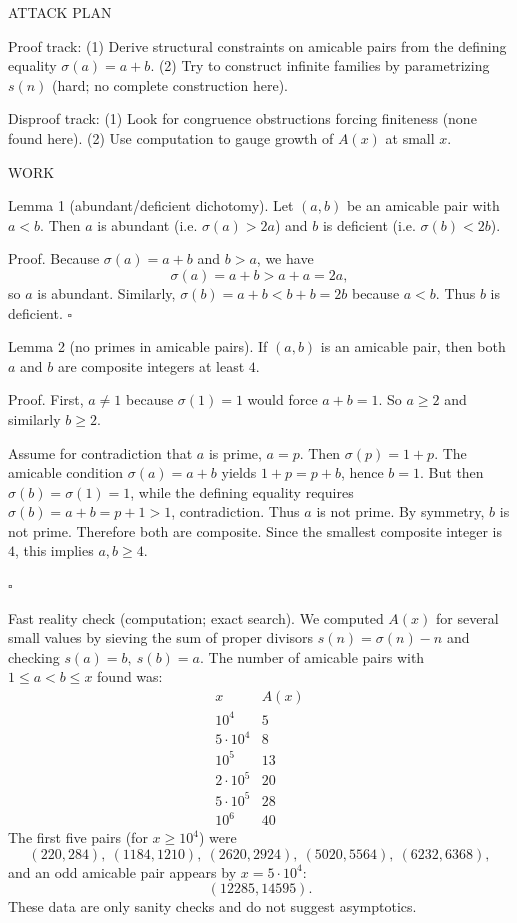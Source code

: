 ATTACK PLAN

Proof track:
(1) Derive structural constraints on amicable pairs from the defining equality $\sigma(a)=a+b$.
(2) Try to construct infinite families by parametrizing $s(n)$ (hard; no complete construction here).

Disproof track:
(1) Look for congruence obstructions forcing finiteness (none found here).
(2) Use computation to gauge growth of $A(x)$ at small $x$.

WORK

Lemma 1 (abundant/deficient dichotomy).
Let $(a,b)$ be an amicable pair with $a<b$.
Then $a$ is abundant (i.e. $\sigma(a)>2a$) and $b$ is deficient (i.e. $\sigma(b)<2b$).

Proof.
Because $\sigma(a)=a+b$ and $b>a$, we have
\[
\sigma(a)=a+b> a+a =2a,
\]
so $a$ is abundant.
Similarly, $\sigma(b)=a+b < b+b=2b$ because $a<b$.
Thus $b$ is deficient.
$\square$

Lemma 2 (no primes in amicable pairs).
If $(a,b)$ is an amicable pair, then both $a$ and $b$ are composite integers at least $4$.

Proof.
First, $a\ne 1$ because $\sigma(1)=1$ would force $a+b=1$.
So $a\ge 2$ and similarly $b\ge 2$.

Assume for contradiction that $a$ is prime, $a=p$.
Then $\sigma(p)=1+p$.
The amicable condition $\sigma(a)=a+b$ yields $1+p = p+b$, hence $b=1$.
But then $\sigma(b)=\sigma(1)=1$, while the defining equality requires $\sigma(b)=a+b=p+1>1$, contradiction.
Thus $a$ is not prime. By symmetry, $b$ is not prime.
Therefore both are composite.
Since the smallest composite integer is $4$, this implies $a,b\ge 4$.

$\square$

Fast reality check (computation; exact search).
We computed $A(x)$ for several small values by sieving the sum of proper divisors $s(n)=\sigma(n)-n$ and checking $s(a)=b,\ s(b)=a$.
The number of amicable pairs with $1\le a<b\le x$ found was:
\[
\begin{array}{r|r}
 x & A(x) \\\hline
 10^4 & 5\\
 5\cdot 10^4 & 8\\
 10^5 & 13\\
 2\cdot 10^5 & 20\\
 5\cdot 10^5 & 28\\
 10^6 & 40
\end{array}
\]
The first five pairs (for $x\ge 10^4$) were
\[(220,284),\ (1184,1210),\ (2620,2924),\ (5020,5564),\ (6232,6368),\]
and an odd amicable pair appears by $x=5\cdot 10^4$:
\[(12285,14595).
\]
These data are only sanity checks and do not suggest asymptotics.

